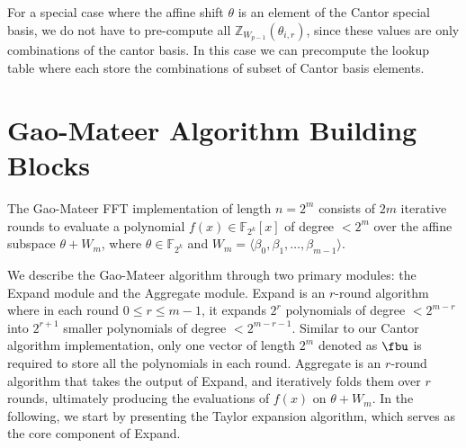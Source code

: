 For a special case where the affine shift $\theta$ is an element of the Cantor special basis, we do not have to pre-compute all $\mathbb{Z}_{W_{p-1}}(\theta_{i, r})$, since these values are only combinations of the cantor basis. In this case we can precompute the lookup table where each store the combinations of subset of Cantor basis elements. 

\section{Gao-Mateer Algorithm Building Blocks}\label{Sec:Gao-implementation}

The Gao-Mateer FFT implementation of length $n = 2^m$ consists of $2m$ iterative rounds to evaluate a polynomial $f(x) \in \mathbb{F}_{2^k}[x]$ of degree $< 2^m$ over the affine subspace $\theta + W_m$, where $\theta \in \mathbb{F}_{2^k}$ and $W_m = \langle \beta_0, \beta_1, \ldots, \beta_{m-1} \rangle$. %

We describe the Gao-Mateer algorithm through two primary modules: the \textsf{Expand} module and the \textsf{Aggregate} module.  \textsf{Expand} is an $r$-round algorithm where in each round $0 \leq r \leq m - 1$, it expands $2^r$ polynomials of degree $< 2^{m-r}$ into $2^{r+1}$ smaller polynomials of degree $<2^{m-r-1}$. Similar to our Cantor algorithm implementation, only one vector of length $2^m$ denoted as $\fbu$ is required to store all the polynomials in each round. \textsf{Aggregate} is an $r$-round algorithm that takes the output of \textsf{Expand}, and iteratively folds them over $r$ rounds, ultimately producing the evaluations of $f(x)$ on $\theta + W_m$. In the following, we start by presenting the Taylor expansion algorithm, which serves as the core component of \textsf{Expand}.


